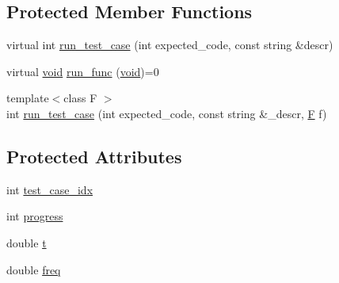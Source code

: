 \subsection*{Protected Member Functions}
\begin{DoxyCompactItemize}
\item 
virtual int \hyperlink{classcvtest_1_1BadArgTest_a5b9e89c96171786149d6ff6b2f6b9d98}{run\-\_\-test\-\_\-case} (int expected\-\_\-code, const string \&descr)
\item 
virtual \hyperlink{legacy_8hpp_a8bb47f092d473522721002c86c13b94e}{void} \hyperlink{classcvtest_1_1BadArgTest_afa8d8a3d02a05a64282130e872e769ef}{run\-\_\-func} (\hyperlink{legacy_8hpp_a8bb47f092d473522721002c86c13b94e}{void})=0
\item 
{\footnotesize template$<$class F $>$ }\\int \hyperlink{classcvtest_1_1BadArgTest_a4f469d9861739ff1580edad09305b81c}{run\-\_\-test\-\_\-case} (int expected\-\_\-code, const string \&\-\_\-descr, \hyperlink{calib3d_8hpp_acc93c21c0e709826b318c946961af8fc}{F} f)
\end{DoxyCompactItemize}
\subsection*{Protected Attributes}
\begin{DoxyCompactItemize}
\item 
int \hyperlink{classcvtest_1_1BadArgTest_a399003e045f8d36d6e5d7d6be08d9798}{test\-\_\-case\-\_\-idx}
\item 
int \hyperlink{classcvtest_1_1BadArgTest_a0aeca69cbbb9e72ead59070cf7c311b5}{progress}
\item 
double \hyperlink{classcvtest_1_1BadArgTest_a510e014faa20b65043d782db0dd8a480}{t}
\item 
double \hyperlink{classcvtest_1_1BadArgTest_a3f035cc70650375c27bb539e045a90c9}{freq}
\end{DoxyCompactItemize}


